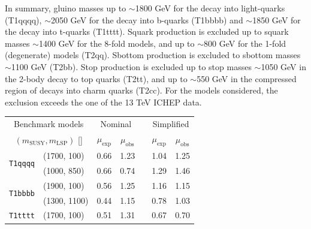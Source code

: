 In summary, gluino masses up to $\sim$1800 GeV for the decay into
light-quarks (T1qqqq), $\sim$2050 GeV for the decay into b-quarks
(T1bbbb) and $\sim$1850 GeV for the decay into t-quarks
(T1tttt). Squark production is excluded up to squark masses $\sim$1400
GeV for the 8-fold models, and up to $\sim$800 GeV for the 1-fold
(degenerate) models (T2qq). Sbottom production is excluded to sbottom
masses $\sim$1100 GeV (T2bb).  Stop production is excluded up to stop
masses $\sim$1050 GeV in the 2-body decay to top quarks (T2tt), and up
to $\sim$550 GeV in the compressed region of decays into charm quarks
(T2cc).  For the models considered, the exclusion exceeds the one of
the 13 TeV ICHEP data.

\begin{table}[!t]
  \label{tab:susy_aggr_limits}
  \centering
  \begin{tabular}{ llccccc }
    \hline
    \multicolumn{2}{c}{Benchmark models}    & \multicolumn{2}{c}{Nominal}
                                            & 
                                            & \multicolumn{2}{c}{Simplified}             \\ [0.3ex]
    \cline{3-4}
    \cline{6-7}
    \multicolumn{2}{c}{$(m_{\text{SUSY}}, m_{\mathrm{LSP}})$ [\GeVns{}]} 
                                            & $\mu_{\text{exp}}$
                                            & $\mu_{\text{obs}}$
                                            & 
                                            & $\mu_{\text{exp}}$
                                            & $\mu_{\text{obs}}$                         \\ [0.3ex]
    \hline
    \multirow{2}{*}{\texttt{T1qqqq}}        & (1700, 100)   & 0.66 & 1.23 &  & 1.04 & 1.25 \\
                                            & (1000, 850)   & 0.66 & 0.74 &  & 1.29 & 1.46 \\ [0.5ex]
    \multirow{2}{*}{\texttt{T1bbbb}}        & (1900, 100)   & 0.56 & 1.25 &  & 1.16 & 1.15 \\
                                            & (1300, 1100)  & 0.44 & 1.15 &  & 0.78 & 1.03 \\ [0.5ex]
    \multirow{2}{*}{\texttt{T1tttt}}        & (1700, 100)   & 0.51 & 1.31 &  & 0.67 & 0.70 \\

\end{tabular}
\end{table}
